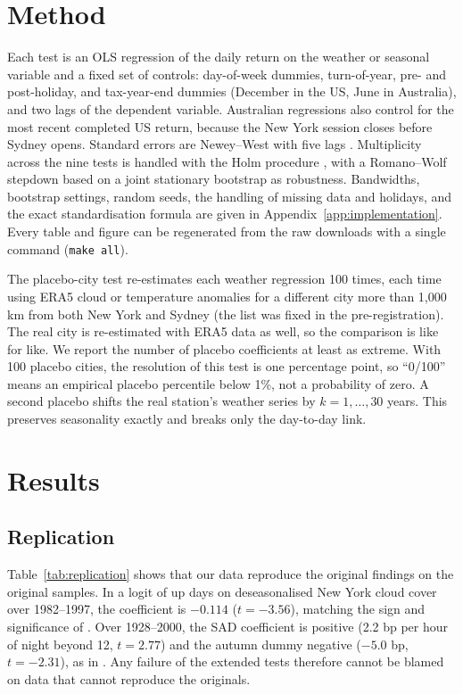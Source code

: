 \documentclass[11pt]{article}
\begin{document}
\section{Method}

Each test is an OLS regression of the daily return on the weather or seasonal variable and a fixed
set of controls: day-of-week dummies, turn-of-year, pre- and post-holiday, and tax-year-end dummies
(December in the US, June in Australia), and two lags of the dependent variable. Australian
regressions also control for the most recent completed US return, because the New York session
closes before Sydney opens. Standard errors are Newey--West with five lags \citep{newey1987}.
Multiplicity across the nine tests is handled with the Holm procedure \citep{holm1979}, with a
Romano--Wolf stepdown \citep{romano2005} based on a joint stationary bootstrap \citep{politis1994}
as robustness. Bandwidths, bootstrap settings, random seeds, the handling of missing data and
holidays, and the exact standardisation formula are given in Appendix~\ref{app:implementation}.
Every table and figure can be regenerated from the raw downloads with a single command
(\texttt{make all}).

The placebo-city test re-estimates each weather regression 100 times, each time using ERA5 cloud or
temperature anomalies for a different city more than 1,000 km from both New York and Sydney (the
list was fixed in the pre-registration). The real city is re-estimated with ERA5 data as well, so
the comparison is like for like. We report the number of placebo coefficients at least as extreme.
With 100 placebo cities, the resolution of this test is one percentage point, so ``0/100'' means an
empirical placebo percentile below 1\%, not a probability of zero. A second placebo shifts the real station's weather series by $k=1,\dots,30$ years. This
preserves seasonality exactly and breaks only the day-to-day link.

\section{Results}

\subsection{Replication}

Table~\ref{tab:replication} shows that our data reproduce the original findings on the original
samples. In a logit of up days on deseasonalised New York cloud cover over 1982--1997, the
coefficient is $-0.114$ ($t=-3.56$), matching the sign and significance of
\citet{hirshleifer2003}. Over 1928--2000, the SAD coefficient is positive (2.2 bp per hour of
night beyond 12, $t=2.77$) and the autumn dummy negative ($-5.0$ bp, $t=-2.31$), as in
\citet{kamstra2003}. Any failure of the extended tests therefore cannot be blamed on data that
cannot reproduce the originals.
\end{document}

